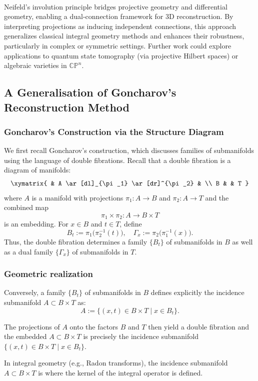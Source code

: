 \documentclass[runningheads]{llncs}
\begin{document}
\, 

Neifeld’s involution principle bridges projective geometry and differential geometry, enabling a dual-connection framework for 3D reconstruction. By interpreting projections as inducing independent connections, this approach generalizes classical integral geometry methods and enhances their robustness, particularly in complex or symmetric settings. Further work could explore applications to quantum state tomography (via projective Hilbert spaces) or algebraic varieties in $\mathbb{CP}^n$.

\subsection{A Generalisation of Goncharov's Reconstruction Method} 
\subsubsection{Goncharov's Construction via the Structure Diagram} We first recall Goncharov's construction, which  discusses families of submanifolds using the language of double fibrations.
Recall that a double fibration is a diagram of manifolds:
\[
\xymatrix{
& A \ar[dl]_{\pi_1} \ar[dr]^{\pi_2} & \\
B & & T
}
\]
where $A$ is a manifold with projections $\pi_1:A\to B$ and $\pi_2:A\to T$ and the combined map 
\[
\pi_1 \times \pi_2 \colon A \to B \times T
\]
is an embedding. For \( x \in B \) and \( t \in T \), define
\[
B_t := \pi_1\bigl(\pi_2^{-1}(t)\bigr), \quad \Gamma_x := \pi_2\bigl(\pi_1^{-1}(x)\bigr).
\]
Thus, the double fibration determines a family \(\{B_t\}\) of submanifolds in \(B\) as well as a dual family \(\{\Gamma_x\}\) of submanifolds in \(T\).
\subsubsection{Geometric realization} Conversely, a family \(\{B_t\}\) of submanifolds in \(B\) defines explicitly the incidence submanifold \( A \subset B \times T \) as:
\[
A:= \{ (x,t) \in B \times T \mid x \in B_t \}.
\]

The projections of \( A \) onto the factors \( B \) and \( T \) then yield a double fibration and the embedded  \( A \subset B \times T \) 
is precisely the incidence submanifold $\{ (x,t) \in B \times T \mid x \in B_t \}$.
~

\begin{remark} 
In integral geometry (e.g., Radon transforms), the incidence submanifold  \( A \subset B \times T \)  is where the kernel of the integral operator is defined. 
\end{remark}
~
\end{document}
